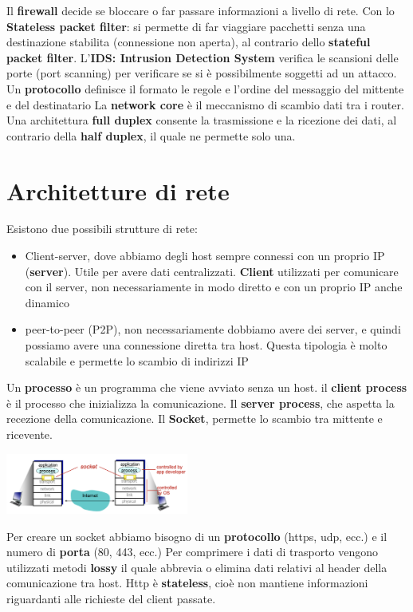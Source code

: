 \documentclass{article}
\begin{document}
Il \textbf{firewall} decide se bloccare o far passare informazioni a livello di rete.
Con lo \textbf{Stateless packet filter}: si permette di far viaggiare pacchetti senza una destinazione stabilita (connessione non aperta), al contrario dello \textbf{stateful packet filter}. L'\textbf{IDS: Intrusion Detection System} verifica le scansioni delle porte (port scanning) per verificare se si è possibilmente soggetti ad un attacco.
Un \textbf{protocollo} definisce il formato le regole e l'ordine del messaggio del mittente e del destinatario
La \textbf{network core} è il meccanismo di scambio dati tra i router. Una architettura \textbf{full duplex} consente la trasmissione e la ricezione dei dati, al contrario della \textbf{half duplex}, il quale ne permette solo una.

\section{Architetture di rete}
Esistono due possibili strutture di rete:
\begin{itemize}
  \item Client-server, dove abbiamo degli host sempre connessi con un proprio IP (\textbf{server}). Utile per avere dati centralizzati. \textbf{Client} utilizzati per comunicare con il server, non necessariamente in modo diretto e con un proprio IP anche dinamico
  \item peer-to-peer (P2P), non necessariamente dobbiamo avere dei server, e quindi possiamo avere una connessione diretta tra host. Questa tipologia è molto scalabile e permette lo scambio di indirizzi IP
\end{itemize}
Un \textbf{processo} è un programma che viene avviato senza un host. il \textbf{client process} è il processo che inizializza la comunicazione. Il \textbf{server process}, che aspetta la recezione della comunicazione.
Il \textbf{Socket}, permette lo scambio tra mittente e ricevente.
\begin{center}
  \includegraphics[width=6cm]{img/socket.png}
\end{center}
Per creare un socket abbiamo bisogno di un \textbf{protocollo} (https, udp, ecc.) e il numero di \textbf{porta} (80, 443, ecc.)
Per comprimere i dati di trasporto vengono utilizzati metodi \textbf{lossy} il quale abbrevia o elimina dati relativi al header della comunicazione tra host.
Http è \textbf{stateless}, cioè non mantiene informazioni riguardanti alle richieste del client passate.
\end{document}
